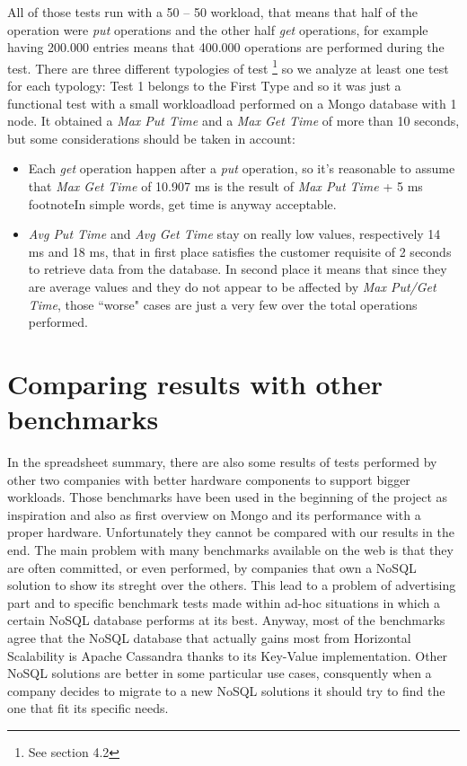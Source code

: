 All of those tests run with a 50 – 50 workload, that means that half of the operation were \textit{put} operations and the other half \textit{get} operations, for example having 200.000 entries means that 400.000 operations are performed during the test.
There are three different typologies of test \footnote{See section 4.2} so we analyze at least one test for each typology: Test 1 belongs to the First Type and so it was just a functional test with a small workloadload performed on a Mongo database with 1 node. It obtained a \textit{Max Put Time} and a \textit{Max Get Time} of more than 10 seconds, but some considerations should be taken in account:
\begin{itemize}
	\item Each \textit{get} operation happen after a \textit{put} operation, so it’s reasonable to assume that \textit{Max Get Time} of 10.907 ms is  the result of \textit{Max Put Time} + 5 ms footnote{In simple words, get time is anyway acceptable}.
	\item \textit{Avg Put Time} and \textit{Avg Get Time} stay on really low values, respectively 14 ms and 18 ms, that in first place satisfies the customer requisite of 2 seconds to retrieve data from the database. In second place it means that since they are average values and they do not appear to be affected by \textit{Max Put/Get Time},  those “worse" cases are just a very few over the total operations performed.
\end{itemize}


\section{Comparing results with other benchmarks}
\label{sec:5}
In the spreadsheet summary, there are also some results of tests performed by other two companies with better hardware components to support bigger workloads. Those benchmarks have been used in the beginning of the project as inspiration and also as first overview on Mongo and its performance with a proper hardware.
Unfortunately they cannot be compared with our results in the end.
The main problem with many benchmarks available on the web is that they are often committed, or even performed, by companies that own a NoSQL solution to show its streght over the others.
This lead to a problem of advertising part and to specific benchmark tests made within ad-hoc situations in which a certain NoSQL database performs at its best.
Anyway, most of the benchmarks agree that the NoSQL database that actually gains most from Horizontal Scalability is Apache Cassandra thanks to its Key-Value implementation.
Other NoSQL solutions are better in some particular use cases, consquently when a company decides to migrate to a new NoSQL solutions  it should try to find the one that fit its specific needs.
